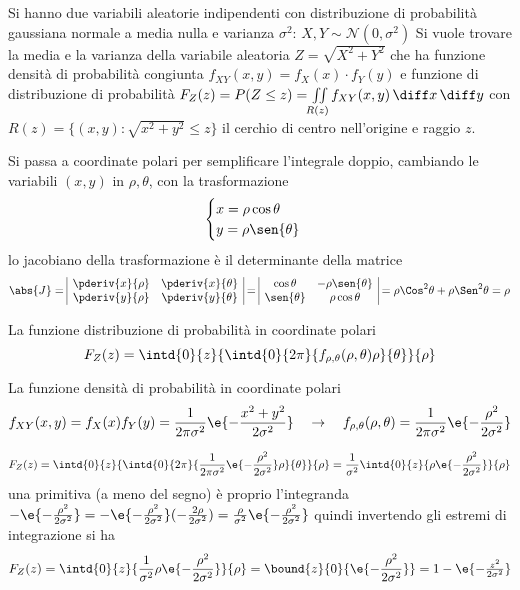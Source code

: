 \begin{esempio}
Si hanno due variabili aleatorie indipendenti con distribuzione di probabilità gaussiana normale a media nulla e varianza $\sigma^2$: $X,Y\sim\mathcal{N}(0,\sigma^2)$
Si vuole trovare la media e la varianza della variabile aleatoria $Z=\sqrt{X^2+Y^2}$ che ha funzione densità di probabilità congiunta $f_{XY}(x,y)=f_X(x)\cdot f_Y(y)$ e funzione di distribuzione di probabilità $F_Z(z)=P(Z\leq z)=\iint\limits_{R(z)}{f_{XY}(x,y)\,\diff x\,\diff y}$
con $R(z)=\{(x,y):\sqrt{x^2+y^2}\leq z\}$ il cerchio di centro nell'origine e raggio $z$.

Si passa a coordinate polari per semplificare l'integrale doppio, cambiando le variabili $(x,y)$ in $\rho,\theta$, con la trasformazione
\[
	\begin{cases}
		x = \rho\cos{\theta}\\
		y = \rho\sen{\theta}
	\end{cases}
\]
lo jacobiano della trasformazione è il determinante della matrice
\[
	\abs{J}=\begin{array}{|cc|}
		\pderiv{x}{\rho}&\pderiv{x}{\theta}  \\
		\pderiv{y}{\rho}&\pderiv{y}{\theta}  \\
	\end{array}=\begin{array}{|cc|}
		\cos{\theta}&-\rho\sen{\theta}  \\
		\sen{\theta}&\rho\cos{\theta}  \\
	\end{array}=\rho\Cos^2\theta+\rho\Sen^2\theta=\rho
\]

La funzione distribuzione di probabilità in coordinate polari
\[
	F_Z(z)=\intd{0}{z}{\intd{0}{2\pi}{f_{\rho,\theta}(\rho,\theta) \rho}{\theta}}{\rho}
\]

La funzione densità di probabilità in coordinate polari
\[
	f_{XY}(x,y)=f_X(x) f_Y(y)=\frac{1}{2\pi\sigma^2}\e{-\frac{x^2+y^2}{2\sigma^2}}\quad\to\quad f_{\rho,\theta}(\rho,\theta)=\frac{1}{2\pi\sigma^2}\e{-\frac{\rho^2}{2\sigma^2}}
\]

\[
	F_Z(z)=\intd{0}{z}{\intd{0}{2\pi}{\frac{1}{2\pi\sigma^2}\e{-\frac{\rho^2}{2\sigma^2}}\rho}{\theta}}{\rho}=\frac{1}{\sigma^2}\intd{0}{z}{\rho\e{-\frac{\rho^2}{2\sigma^2}}}{\rho}
\]
una primitiva (a meno del segno) è proprio l'integranda $-\e{-\frac{\rho^2}{2\sigma^2}}=-\e{-\frac{\rho^2}{2\sigma^2}}(-\frac{2\rho}{2\sigma^2})=\frac{\rho}{\sigma^2}\e{-\frac{\rho^2}{2\sigma^2}}$ quindi invertendo gli estremi di integrazione si ha
\[
	F_Z(z)=\intd{0}{z}{\frac{1}{\sigma^2}\rho\e{-\frac{\rho^2}{2\sigma^2}}}{\rho}=\bound{z}{0}{\e{-\frac{\rho^2}{2\sigma^2}}}=1-\e{-\tfrac{z^2}{2\sigma^2}}
\]


\end{esempio}
